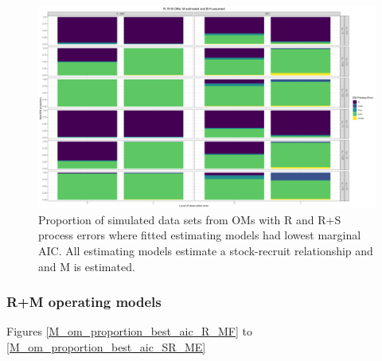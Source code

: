 \documentclass[
  12pt,
]{article}
\begin{document}
\begin{landscape}
\begin{figure}
\caption{Proportion of simulated data sets from OMs with R and R+S process errors where fitted estimating models had lowest marginal AIC. All estimating models estimate a stock-recruit relationship and and M is estimated.} \label{naa_om_proportion_best_aic_SR_ME}
\begin{center}
\includegraphics[width = \textwidth]{naa_om_proportion_best_aic_SR_ME.png}
\end{center}
\end{figure}
\end{landscape}

\hypertarget{rm-operating-models-1}{%
\subsubsection*{R+M operating models}\label{rm-operating-models-1}}

Figures \ref{M_om_proportion_best_aic_R_MF} to
\ref{M_om_proportion_best_aic_SR_ME}
\end{document}
